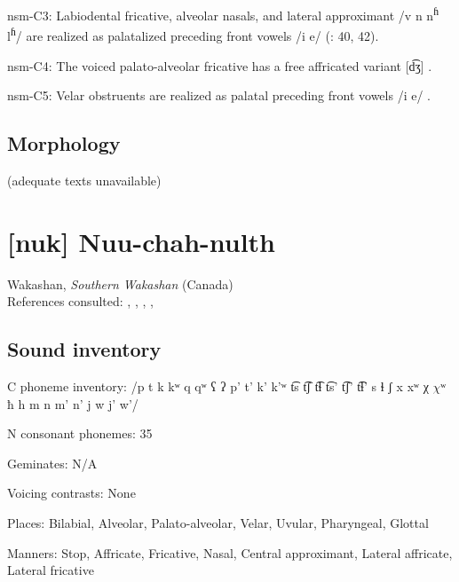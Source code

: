 {\begin{appendixdesc}
\item[nsm-C3:] Labiodental fricative, alveolar nasals, and lateral approximant /v n n\textsuperscript{ɦ} l\textsuperscript{ɦ}/ are realized as palatalized preceding front vowels /i e/ (\citealt{Teo2009}: 40, 42).

\item[nsm-C4:] The voiced palato-alveolar fricative has a free affricated variant [d͡ʒ] \citep[40]{Teo2009}.

\item[nsm-C5:] Velar obstruents are realized as palatal preceding front vowels /i e/ \citep[368]{Teo2012}.
\end{appendixdesc}
\subsection*{Morphology}

(adequate texts unavailable)

\section*{[nuk] Nuu-chah-nulth}   %
Wakashan, \textit{Southern Wakashan} (Canada)\medskip\\
References consulted: \citet{CarlsonEtAl2001}, \citet{Davidson2002}, \citet{Kim2003}, \citet{Rose1981}, \citet{Stonham1999}

\subsection*{Sound inventory}
\begin{appendixdesc}

\item[C phoneme inventory:] /p t k kʷ q qʷ ʕ ʔ p’ t’ k’ k’ʷ t͡s t͡ʃ t͡ɬ t͡s’ t͡ʃ’ t͡ɬ’ s ɬ ʃ x xʷ χ $\chi ʷ$ ħ h m n m’ n’ j w j’ w’/

\item[N consonant phonemes:] 35

\item[Geminates:] N/A

\item[Voicing contrasts:] None

\item[Places:] Bilabial, Alveolar, Palato-alveolar, Velar, Uvular, Pharyngeal, Glottal

\item[Manners:] Stop, Affricate, Fricative, Nasal, Central approximant, Lateral affricate, Lateral fricative


\end{appendixdesc}}
